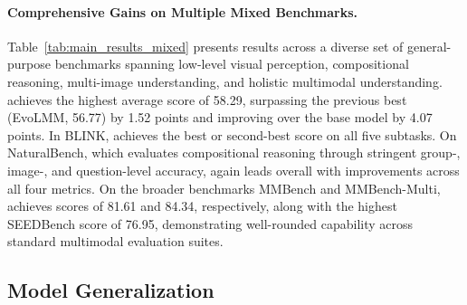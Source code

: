 \paragraph{Comprehensive Gains on Multiple Mixed Benchmarks.}

Table~\ref{tab:main_results_mixed} presents results across a diverse set of general-purpose benchmarks spanning low-level visual perception, compositional reasoning, multi-image understanding, and holistic multimodal understanding.
\ours achieves the highest average score of 58.29, surpassing the previous best (EvoLMM, 56.77) by 1.52 points and improving over the base model by 4.07 points.
In BLINK, \ours 
achieves the best or second-best score on all five subtasks.
On NaturalBench, which evaluates compositional reasoning through stringent group-, image-, and question-level accuracy, \ours again leads overall with improvements across all four metrics.
On the broader benchmarks MMBench and MMBench-Multi, \ours achieves scores of 81.61 and 84.34, respectively, along with the highest SEEDBench score of 76.95, demonstrating well-rounded capability across standard multimodal evaluation suites.

\subsection{Model Generalization}
\label{sec:generalization}

